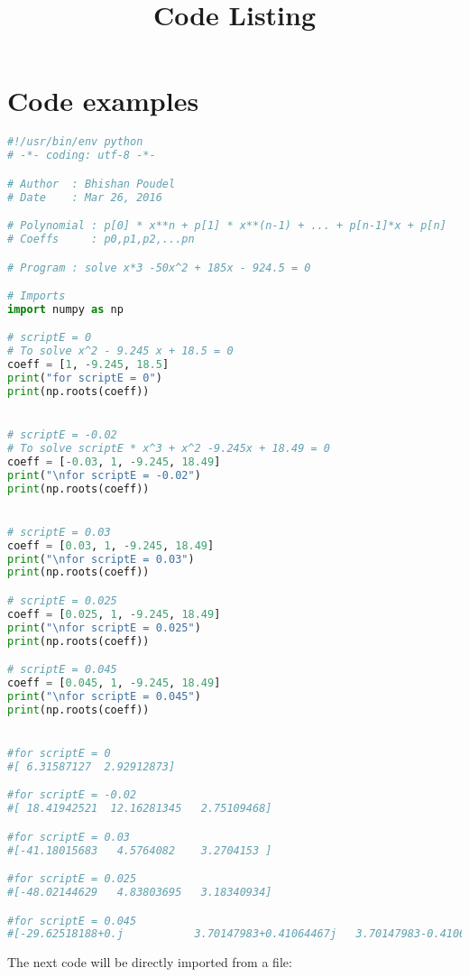 \documentclass{article}
\title{Code Listing}
\date{ }
\begin{document}
\maketitle

\section{Code examples}

\begin{lstlisting}[language=Python, caption=Python example]
#!/usr/bin/env python
# -*- coding: utf-8 -*-

# Author  : Bhishan Poudel
# Date    : Mar 26, 2016

# Polynomial : p[0] * x**n + p[1] * x**(n-1) + ... + p[n-1]*x + p[n]
# Coeffs     : p0,p1,p2,...pn

# Program : solve x*3 -50x^2 + 185x - 924.5 = 0

# Imports
import numpy as np

# scriptE = 0
# To solve x^2 - 9.245 x + 18.5 = 0
coeff = [1, -9.245, 18.5]
print("for scriptE = 0")
print(np.roots(coeff))


# scriptE = -0.02
# To solve scriptE * x^3 + x^2 -9.245x + 18.49 = 0
coeff = [-0.03, 1, -9.245, 18.49]
print("\nfor scriptE = -0.02")
print(np.roots(coeff))


# scriptE = 0.03
coeff = [0.03, 1, -9.245, 18.49]
print("\nfor scriptE = 0.03")
print(np.roots(coeff))

# scriptE = 0.025
coeff = [0.025, 1, -9.245, 18.49]
print("\nfor scriptE = 0.025")
print(np.roots(coeff))

# scriptE = 0.045
coeff = [0.045, 1, -9.245, 18.49]
print("\nfor scriptE = 0.045")
print(np.roots(coeff))


#for scriptE = 0
#[ 6.31587127  2.92912873]

#for scriptE = -0.02
#[ 18.41942521  12.16281345   2.75109468]

#for scriptE = 0.03
#[-41.18015683   4.5764082    3.2704153 ]

#for scriptE = 0.025
#[-48.02144629   4.83803695   3.18340934]

#for scriptE = 0.045
#[-29.62518188+0.j           3.70147983+0.41064467j   3.70147983-0.41064467j]

\end{lstlisting}

\clearpage

The next code will be directly imported from a file:



\clearpage

\lstlistoflistings
\end{document}
